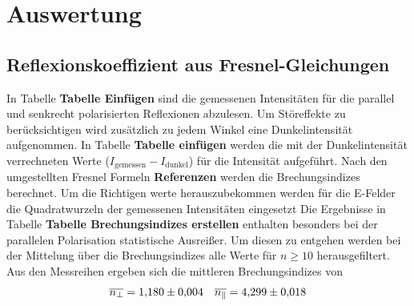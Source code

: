 \section{Auswertung}

\subsection{Reflexionskoeffizient aus Fresnel-Gleichungen}
In Tabelle \textbf{Tabelle Einfügen} sind die gemessenen Intensitäten für die parallel 
und senkrecht polarisierten Reflexionen abzulesen.
Um Störeffekte zu berücksichtigen wird zusätzlich zu jedem Winkel eine Dunkelintensität aufgenommen.
In Tabelle \textbf{Tabelle einfügen} werden die mit der Dunkelintensität verrechneten Werte ($I_\text{gemessen} - I_\text{dunkel}$)
für die Intensität aufgeführt.
Nach den umgestellten Fresnel Formeln \textbf{Referenzen} werden die Brechungsindizes berechnet.
Um die Richtigen werte herauszubekommen werden für die E-Felder die Quadratwurzeln der gemessenen Intensitäten eingesetzt
Die Ergebnisse in Tabelle \textbf{Tabelle Brechungsindizes erstellen} enthalten besonders bei der 
parallelen Polarisation statistische Ausreißer. 
Um diesen zu entgehen werden bei der Mittelung über die Brechungsindizes alle Werte für $n \geq 10$ herausgefiltert.
Aus den Messreihen ergeben sich die mittleren Brechungsindizes von 
\begin{align}
    \overline{n_\perp} &= \num{1.180 \pm 0.004} & \overline{n_\parallel} = \num{4.299 \pm 0.018}
\end{align}
